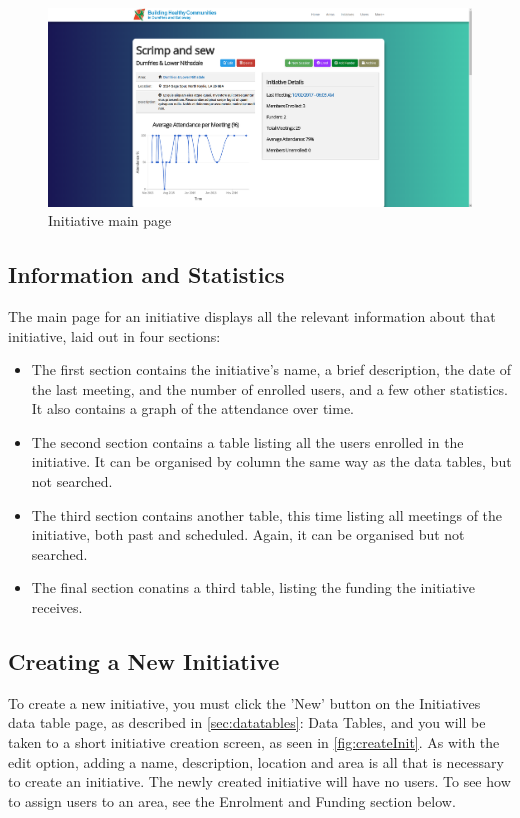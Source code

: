 \documentclass{bhcguides}
\begin{document}
\begin{figure}[h!]
 \centerline{\includegraphics[width=\textwidth, height=\textheight, keepaspectratio]{initmainpage.png}}
 \caption{Initiative main page}
 \label{fig:initMainPage}
\end{figure}

\subsection{Information and Statistics}
\label{ssec:initinfoandstats}

The main page for an initiative displays all the relevant information about that initiative, laid out in four sections:

\begin{itemize}
	\item The first section contains the initiative's name, a brief description, the date of the last meeting, and the number of enrolled users, and a few other statistics. It also contains a graph of the attendance over time.
	\item The second section contains a table listing all the users enrolled in the initiative. It can be organised by column the same way as the data tables, but not searched.
	\item The third section contains another table, this time listing all meetings of the initiative, both past and scheduled. Again, it can be organised but not searched.
	\item The final section conatins a third table, listing the funding the initiative receives.
\end{itemize}

\subsection{Creating a New Initiative}
\label{ssec:createinit}

To create a new initiative, you must click the 'New' button on the Initiatives data table page, as described in \autoref{sec:datatables}: Data Tables, and you will be taken to a short initiative creation screen, as seen in \autoref{fig:createInit}. As with the edit option, adding a name, description, location and area is all that is necessary to create an initiative. The newly created initiative will have no users. To see how to assign users to an area, see the Enrolment and Funding section below.
\end{document}
